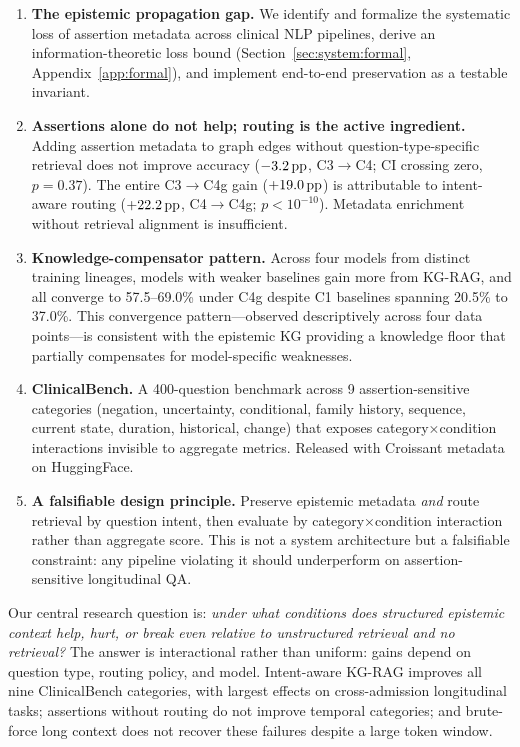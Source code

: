 \begin{enumerate}[leftmargin=*, topsep=4pt, itemsep=2pt]
  \item \textbf{The epistemic propagation gap.} We identify and formalize the systematic loss of assertion metadata across clinical NLP pipelines, derive an information-theoretic loss bound (Section~\ref{sec:system:formal}, Appendix~\ref{app:formal}), and implement end-to-end preservation as a testable invariant.

  \item \textbf{Assertions alone do not help; routing is the active ingredient.} Adding assertion metadata to graph edges without question-type-specific retrieval does not improve accuracy ($-3.2\,\text{pp}$, C3$\to$C4; CI crossing zero, $p = 0.37$). The entire C3$\to$C4g gain ($+19.0\,\text{pp}$) is attributable to intent-aware routing ($+22.2\,\text{pp}$, C4$\to$C4g; $p < 10^{-10}$). Metadata enrichment without retrieval alignment is insufficient.

  \item \textbf{Knowledge-compensator pattern.} Across four models from distinct training lineages, models with weaker baselines gain more from KG-RAG, and all converge to 57.5--69.0\% under C4g despite C1 baselines spanning 20.5\% to 37.0\%. This convergence pattern---observed descriptively across four data points---is consistent with the epistemic KG providing a knowledge floor that partially compensates for model-specific weaknesses.

  \item \textbf{ClinicalBench.} A 400-question benchmark across 9 assertion-sensitive categories (negation, uncertainty, conditional, family history, sequence, current state, duration, historical, change) that exposes category$\times$condition interactions invisible to aggregate metrics. Released with Croissant metadata on HuggingFace.

  \item \textbf{A falsifiable design principle.} Preserve epistemic metadata \emph{and} route retrieval by question intent, then evaluate by category$\times$condition interaction rather than aggregate score. This is not a system architecture but a falsifiable constraint: any pipeline violating it should underperform on assertion-sensitive longitudinal QA.
\end{enumerate}

Our central research question is: \emph{under what conditions does structured epistemic context help, hurt, or break even relative to unstructured retrieval and no retrieval?}
The answer is interactional rather than uniform: gains depend on question type, routing policy, and model.
Intent-aware KG-RAG improves all nine ClinicalBench categories, with largest effects on cross-admission longitudinal tasks; assertions without routing do not improve temporal categories; and brute-force long context does not recover these failures despite a large token window.
